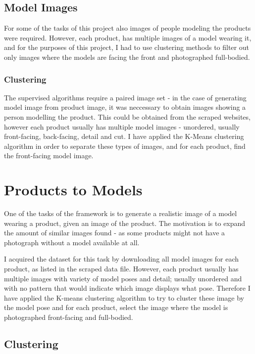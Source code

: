 \documentclass{article}
\begin{document}
\subsection{Model Images}
For some of the tasks of this project also images of people modeling the products were required.  However, each product, has multiple images of a model wearing it, and for the purposes of this project, I had to use clustering methods to filter out only images where the models are facing the front and photographed full-bodied.

\subsubsection{Clustering}
The supervised algorithms require a paired image set - in the case of generating model image from product image, it was neccessary to obtain images showing a person modelling the product. This could be obtained from the scraped websites, however each product usually has multiple model images - unordered, usually front-facing, back-facing, detail and cut. I have applied the K-Means clustering algorithm in order to separate these types of images, and for each product, find the front-facing model image.






\section{Products to Models}
One of the tasks of the framework is to generate a realistic image of a model wearing a product, given an image of the product. The motivation is to expand the amount of similar images found - as some products might not have a photograph without a model available at all.

I acquired the dataset for this task by downloading all model images for each product, as listed in the scraped data file. However, each product usually has multiple images with variety of model poses and detail; usually unordered and with no pattern that would indicate which image displays what pose. Therefore I have applied the K-means clustering algorithm to try to cluster these image by the model pose and for each product, select the image where the model is photographed front-facing and full-bodied.

\subsection{Clustering}



\newpage


\end{document}
